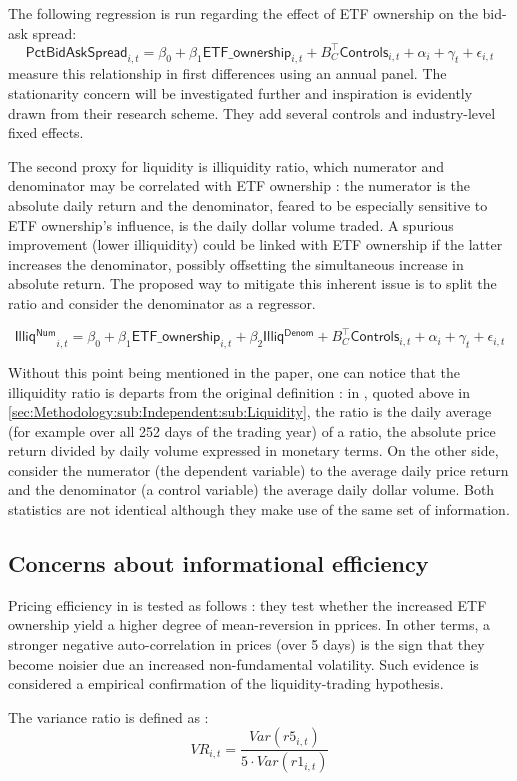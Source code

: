 The following regression is run regarding the effect of ETF ownership on the bid-ask spread:
\begin{equation}
 \mathsf{PctBidAskSpread}_{i,t} = \beta_{0} + \beta_{1} \mathsf{ETF\_ownership}_{i, t} + B_{C}^{\intercal} \mathsf{Controls}_{i, t} + \alpha_{i} + \gamma_{t} + \epsilon_{i, t}
\end{equation}
\textcite{Israeli2017} measure this relationship in first differences using an annual panel. The stationarity concern will be investigated further and inspiration is evidently drawn from their research scheme. They add several controls and industry-level fixed effects.

The second proxy for liquidity is \textcite{Amihud2002} illiquidity ratio, which numerator and denominator may be correlated with ETF ownership : the numerator is the absolute daily return and the denominator, feared to be especially sensitive to ETF ownership's influence, is the daily dollar volume traded. A spurious improvement (lower illiquidity) could be linked with ETF ownership if the latter increases the denominator, possibly offsetting the simultaneous increase in absolute return. The proposed way to mitigate this inherent issue is to split the ratio and consider the denominator as a regressor.
 
\begin{equation}
   \mathsf{Illiq^{Num}}_{i,t} = \beta_{0} + \beta_{1} \mathsf{ETF\_ownership}_{i, t} + \beta_{2} \mathsf{Illiq^{Denom}} + B_{C}^{\intercal} \mathsf{Controls}_{i, t} + \alpha_{i} + \gamma_{t} + \epsilon_{i, t}
\end{equation}

Without this point being mentioned in the paper, one can notice that the illiquidity ratio is departs from the original definition : in \textcite{Amihud2002}, quoted above in \autoref{sec:Methodology:sub:Independent:sub:Liquidity}, the ratio is the daily average (for example over all 252 days of the trading year) of a ratio, the absolute price return divided by daily volume expressed in monetary terms. On the other side, \textcite{Israeli2017} consider the numerator (the dependent variable) to the average daily price return and the denominator (a control variable) the average daily dollar volume. Both statistics are not identical although they make use of the same set of information.
\subsection{Concerns about informational efficiency}
\label{subsec:Method:Efficiency}
Pricing efficiency in \textcite{Ben-David2018} is tested as follows : they test whether the increased ETF ownership yield a higher degree of mean-reversion in pprices. In other terms, a stronger negative auto-correlation in prices (over 5 days) is the sign that they become noisier due an increased non-fundamental volatility. Such evidence is considered a empirical confirmation of the liquidity-trading hypothesis.

The variance ratio is defined as :
\begin{equation}
 VR_{i,t} = \frac{Var(r5_{i, t})}{5 \cdot Var(r1_{i, t})}
  \end{equation}

